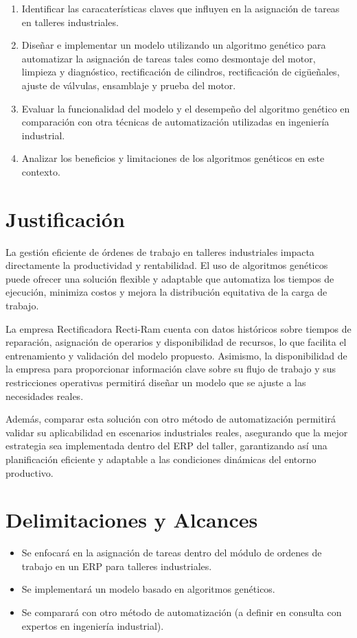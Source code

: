 \begin{enumerate}
    \item Identificar las caracaterísticas claves que influyen en la asignación de tareas en talleres industriales.
    \item Diseñar e implementar un modelo utilizando un algoritmo genético para automatizar la asignación de tareas tales como desmontaje del motor, limpieza y diagnóstico, rectificación de cilindros, rectificación de cigüeñales, ajuste de válvulas, ensamblaje y prueba del motor.
    \item Evaluar la funcionalidad del modelo y el desempeño del algoritmo genético en comparación con otra técnicas de automatización utilizadas en ingeniería industrial.
    \item Analizar los beneficios y limitaciones de los algoritmos genéticos en este contexto.
\end{enumerate}

\section{Justificación}

La gestión eficiente de órdenes de trabajo en talleres industriales impacta directamente la productividad y rentabilidad. El uso de algoritmos genéticos puede ofrecer una solución flexible y adaptable que automatiza los tiempos de ejecución, minimiza costos y mejora la distribución equitativa de la carga de trabajo.  

La empresa Rectificadora Recti-Ram  cuenta con datos históricos sobre tiempos de reparación, asignación de operarios y disponibilidad de recursos, lo que facilita el entrenamiento y validación del modelo propuesto. Asimismo, la disponibilidad de la empresa para proporcionar información clave sobre su flujo de trabajo y sus restricciones operativas permitirá diseñar un modelo que se ajuste a las necesidades reales.  

Además, comparar esta solución con otro método de automatización permitirá validar su aplicabilidad en escenarios industriales reales, asegurando que la mejor estrategia sea implementada dentro del ERP del taller, garantizando así una planificación eficiente y adaptable a las condiciones dinámicas del entorno productivo.

\section{Delimitaciones y Alcances}

\begin{itemize}
    \item Se enfocará en la asignación de tareas dentro del módulo de ordenes de trabajo en un ERP para talleres industriales.
    \item Se implementará un modelo basado en algoritmos genéticos.
    \item Se comparará con otro método de automatización (a definir en consulta con expertos en ingeniería industrial).
\end{itemize}